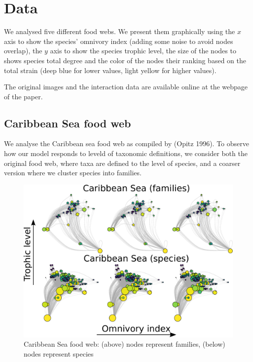 \documentclass[11pt,article,oneside]{memoir}
\makeatletter
\def\maxwidth{\ifdim\Gin@nat@width>\linewidth\linewidth
\else\Gin@nat@width\fi}
\let\Oldincludegraphics\includegraphics
\renewcommand{\includegraphics}[1]{\Oldincludegraphics[width=\maxwidth]{#1}}
\makeatother
\begin{document}
\newpage

\section{Data}\label{data}

We analysed five different food webs. We present them graphically using
the \(x\) axis to show the species' omnivory index (adding some noise to
avoid nodes overlap), the \(y\) axis to show the species trophic level,
the size of the nodes to shows species total degree and the color of the
nodes their ranking based on the total strain (deep blue for lower
values, light yellow for higher values).

The original images and the interaction data are available online at the
webpage of the paper.

\newpage

\subsection{Caribbean Sea food web}\label{caribbean-sea-food-web}

We analyse the Caribbean sea food web as compiled by (Opitz 1996). To
observe how our model responds to leveld of taxonomic definitions, we
consider both the original food web, where taxa are defined to the level
of species, and a coarser version where we cluster species into
families.

\begin{figure}[htbp]
\centering
\includegraphics{Images/Webs/Caribbean_Species.pdf}
\caption{Caribbean Sea food web: (above) nodes represent families,
(below) nodes represent species}
\end{figure}
\end{document}
